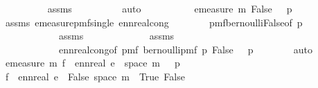 \begin{isabellebody}
\ \ \ \ \ \ \ \ \isamarkupfalse%
\ assms{\isacharparenleft}{\kern0pt}{}{\isacharparenright}{\kern0pt}\isanewline
\ \ \ \ \ \ \ \ \isamarkupfalse%
\ auto\isanewline
\ \ \ \ \isamarkupfalse%
\isanewline
\ \ \ \ \isamarkupfalse%
\ {\isachardoublequoteopen}emeasure\ m\ {\isacharparenleft}{\kern0pt}{\isacharbraceleft}{\kern0pt}False{\isacharbraceright}{\kern0pt}{\isacharparenright}{\kern0pt}\ {\isacharequal}{\kern0pt}\ \ {}{\isacharminus}{\kern0pt}p{}{\isachardoublequoteclose}\isanewline
\ \ \ \ \ \ \isamarkupfalse%
\ assms{\isacharparenleft}{\kern0pt}{}{\isacharparenright}{\kern0pt}\ emeasure{\isacharunderscore}{\kern0pt}pmf{\isacharunderscore}{\kern0pt}single\ ennreal{\isacharunderscore}{\kern0pt}cong\isanewline
\ \ \ \ \ \ \isamarkupfalse%
\ pmf{\isacharunderscore}{\kern0pt}bernoulli{\isacharunderscore}{\kern0pt}False{\isacharbrackleft}{\kern0pt}of\ p{}{\isacharbrackright}{\kern0pt}\isanewline
\ \ \ \ \ \ \ \ \ \ \ \ assms{\isacharparenleft}{\kern0pt}{}{\isacharparenright}{\kern0pt}\ \isanewline
\ \ \ \ \ \ \ \ \ \ \ \ assms{\isacharparenleft}{\kern0pt}{}{\isacharparenright}{\kern0pt}\ \isanewline
\ \ \ \ \ \ \ \ \ \ \ \ ennreal{\isacharunderscore}{\kern0pt}cong{\isacharbrackleft}{\kern0pt}of\ {\isachardoublequoteopen}pmf\ {\isacharparenleft}{\kern0pt}bernoulli{\isacharunderscore}{\kern0pt}pmf\ p{}{\isacharparenright}{\kern0pt}\ False{\isachardoublequoteclose}\ {\isachardoublequoteopen}{}\ {\isacharminus}{\kern0pt}\ p{}{\isachardoublequoteclose}{\isacharbrackright}{\kern0pt}\isanewline
\ \ \ \ \ \ \isamarkupfalse%
\ auto\isanewline
\ \ \ \ \isamarkupfalse%
\ \isamarkupfalse%
\ {\isachardoublequoteopen}emeasure\ m\ {\isacharparenleft}{\kern0pt}f\ {\isacharminus}{\kern0pt}{\isacharbackquote}{\kern0pt}\ {\isacharbraceleft}{\kern0pt}ennreal\ e{\isacharbraceright}{\kern0pt}\ {\isasyminter}\ space\ m{\isacharparenright}{\kern0pt}\ {\isacharequal}{\kern0pt}\ {}{\isacharminus}{\kern0pt}\ p{}{\isachardoublequoteclose}\isanewline
\ \ \ \ \ \ \isamarkupfalse%
\ {\isacartoucheopen}f\ {\isacharminus}{\kern0pt}{\isacharbackquote}{\kern0pt}\ {\isacharbraceleft}{\kern0pt}ennreal\ e{\isacharbraceright}{\kern0pt}\ {\isacharequal}{\kern0pt}\ {\isacharbraceleft}{\kern0pt}False{\isacharbraceright}{\kern0pt}{\isacartoucheclose}\ {\isacartoucheopen}space\ m\ {\isacharequal}{\kern0pt}\ {\isacharbraceleft}{\kern0pt}True{\isacharcomma}{\kern0pt}\ False{\isacharbraceright}{\kern0pt}{\isacartoucheclose}\ \isanewline

\end{isabellebody}

